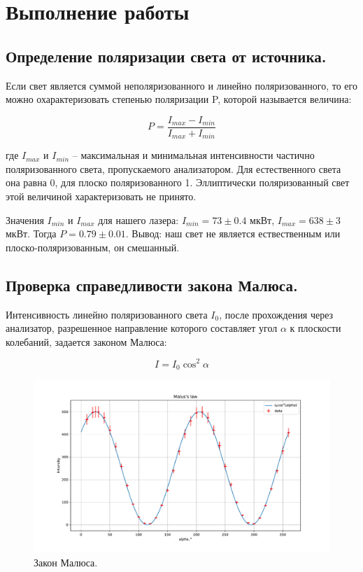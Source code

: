 \documentclass[a4paper, 12pt]{article}
\begin{document}
\section{Выполнение работы}

\subsection{Определение поляризации света от источника.}

Если свет является суммой неполяризованного и линейно поляризованного, то его можно охарактеризовать степенью поляризации P, которой называется величина:

\begin{equation}
P = \frac{I_{max}-I_{min}} {I_{max}+I_{min}} 
\end{equation}

где $I_{max}$ и  $I_{min}$ – максимальная и минимальная интенсивности частично поляризованного света, пропускаемого анализатором. Для естественного света она равна 0, для плоско
поляризованного 1. Эллиптически поляризованный свет этой величиной характеризовать не принято.


 Значения $I_{min}$ и $I_{max}$ для нашего лазера: $I_{min} = 73\pm 0.4 $ мкВт,    $I_{max} = 638 \pm 3$ мкВт. Тогда $P = 0.79\pm 0.01$. Вывод: наш свет не является ествественным  или плоско-поляризованным, он смешанный.








\subsection{Проверка справедливости закона Малюса.}

Интенсивность линейно поляризованного света $I_0$, после прохождения через анализатор, разрешенное направление которого составляет угол $\alpha$ к плоскости колебаний, задается законом Малюса:

\begin{equation}
I = I_0 \cos^2\alpha 
\end{equation}


\begin{figure}[H]
	\centering
	\includegraphics[scale=0.7]{Malus}
	\caption{Закон Малюса.}
\end{figure}
\end{document}
